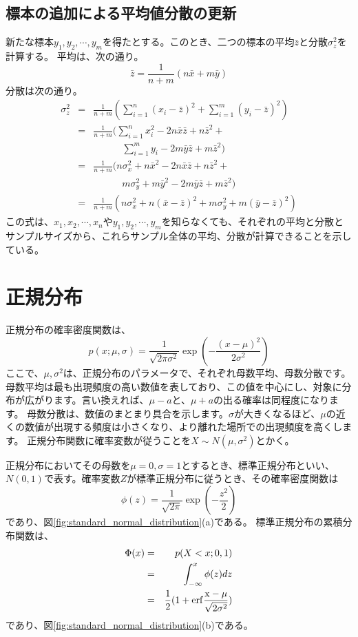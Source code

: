 \subsection{標本の追加による平均値分散の更新}
新たな標本$y_1,y_2,\cdots,y_m$を得たとする。このとき、二つの標本の平均$\bar{z}$と分散$\sigma_z^2$を計算する。
平均は、次の通り。
\begin{equation*}
    \bar{z} = \frac{1}{n+m}(n\bar{x}+m\bar{y})
\end{equation*}
分散は次の通り。
\begin{eqnarray*}
    \sigma_z^2 &=& \frac{1}{n+m}(\sum_{i=1}^n(x_i-\bar{z})^2+\sum_{i=1}^m(y_i-\bar{z})^2) \\
    &=& \frac{1}{n+m}(\sum_{i=1}^n x_i^2-2n\bar{x}\bar{z}+n\bar{z}^2+ \\ 
    & &\qquad\quad \sum_{i=1}^m y_i -2m\bar{y}\bar{z}+m\bar{z}^2) \\
    &=& \frac{1}{n+m}( n\sigma_x^2 +n\bar{x}^2 -2n\bar{x}\bar{z} + n\bar{z}^2+ \\
    & &\qquad\quad  m\sigma^2_y+m\bar{y}^2-2m\bar{y}\bar{z}+m\bar{z}^2 ) \\
    &=& \frac{1}{n+m} (n\sigma^2_x+n(\bar{x}-\bar{z})^2 +m\sigma^2_y +m(\bar{y}-\bar{z})^2)
\end{eqnarray*}
この式は、$x_1,x_2,\cdots,x_n$や$y_1,y_2,\cdots,y_m$を知らなくても、それぞれの平均と分散とサンプルサイズから、これらサンプル全体の平均、分散が計算できることを示している。

\section{正規分布}
正規分布の確率密度関数は、
\begin{equation}
p(x;\mu,\sigma)=\frac{1}{\sqrt{2\pi\sigma^2}}\exp\left(-\frac{(x-\mu)^2}{2\sigma^2} \right)
\end{equation}
ここで、$\mu,\sigma^2$は、正規分布のパラメータで、それぞれ母数平均、母数分散です。
母数平均は最も出現頻度の高い数値を表しており、この値を中心にし、対象に分布が広がります。言い換えれば、$\mu-a$と、$\mu+a$の出る確率は同程度になります。
母数分散は、数値のまとまり具合を示します。$\sigma$が大きくなるほど、$\mu$の近くの数値が出現する頻度は小さくなり、より離れた場所での出現頻度を高くします。
正規分布関数に確率変数が従うことを$X\sim N(\mu,\sigma^2)$とかく。



正規分布においてその母数を$\mu=0,\sigma=1$とするとき、標準正規分布といい、$N(0,1)$で表す。確率変数$Z$が標準正規分布に従うとき、その確率密度関数は
\begin{equation}
\phi(z) = \frac{1}{\sqrt{2\pi}}\exp(-\frac{z^2}{2})
\end{equation}
であり、図\ref{fig:standard_normal_distribution}(a)である。
標準正規分布の累積分布関数は、
\begin{eqnarray}
\Phi(x) &=& p(X<x; 0,1) \\
    &=& \int_{-\infty}^x \phi(z)dz \\
    &=& \frac{1}{2}(1+\rm{erf}\frac{x-\mu}{\sqrt{2\sigma^2}})
\end{eqnarray}
であり、図\ref{fig:standard_normal_distribution}(b)である。

